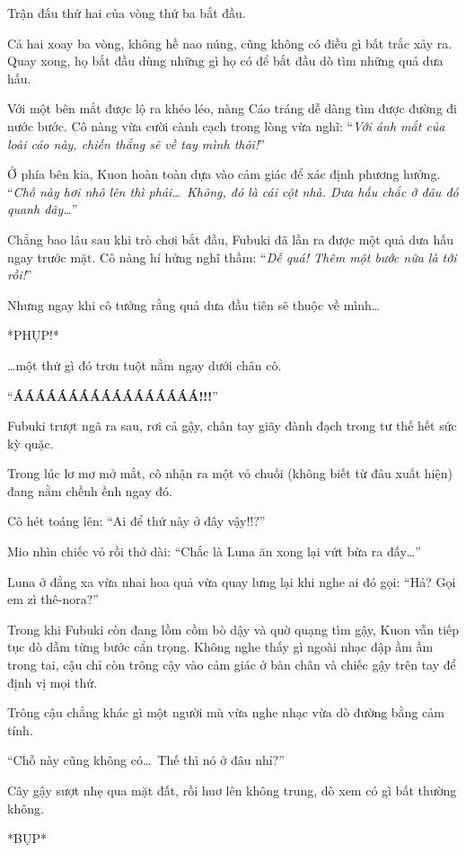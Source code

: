 \documentclass[../main.tex]{subfiles}
\begin{document}
Trận đấu thứ hai của vòng thứ ba bắt đầu.

Cả hai xoay ba vòng, không hề nao núng, cũng không có điều gì bất trắc xảy ra. Quay xong, họ bắt đầu dùng những gì họ có để bắt đầu dò tìm những quả dưa hấu.

Với một bên mắt được lộ ra khéo léo, nàng Cáo tráng dễ dàng tìm được đường đi nước bước. Cô nàng vừa cười cành cạch trong lòng vừa nghĩ: ``\textit{Với ánh mắt của loài cáo này, chiến thắng sẽ về tay mình thôi!}''

Ở phía bên kia, Kuon hoàn toàn dựa vào cảm giác để xác định phương hướng. ``\textit{Chỗ này hơi nhô lên thì phải\dots\ Không, đó là cái cột nhà. Dưa hấu chắc ở đâu đó quanh đây\dots}''

Chẳng bao lâu sau khi trò chơi bắt đầu, Fubuki đã lần ra được một quả dưa hấu ngay trước mặt. Cô nàng hí hửng nghĩ thầm:
``\textit{Dễ quá! Thêm một bước nữa là tới rồi!}''

Nhưng ngay khi cô tưởng rằng quả dưa đầu tiên sẽ thuộc về mình\dots

*PHỤP!*

\dots một thứ gì đó trơn tuột nằm ngay dưới chân cô.

``\textbf{ÁÁÁÁÁÁÁÁÁÁÁÁÁÁÁÁÁ!!!}''

Fubuki trượt ngã ra sau, rơi cả gậy, chân tay giãy đành đạch trong tư thế hết sức kỳ quặc.

Trong lúc lơ mơ mở mắt, cô nhận ra một vỏ chuối (không biết từ đâu xuất hiện) đang nằm chềnh ềnh ngay đó.

Cô hét toáng lên: ``Ai để thứ này ở đây vậy!!?''

Mio nhìn chiếc vỏ rồi thở dài: ``Chắc là Luna ăn xong lại vứt bừa ra đấy\dots''

Luna ở đằng xa vừa nhai hoa quả vừa quay lưng lại khi nghe ai đó gọi: ``Hả? Gọi em zì thê-nora?''

Trong khi Fubuki còn đang lồm cồm bò dậy và quờ quạng tìm gậy, Kuon vẫn tiếp tục dò dẫm từng bước cẩn trọng. Không nghe thấy gì ngoài nhạc đập ầm ầm trong tai, cậu chỉ còn trông cậy vào cảm giác ở bàn chân và chiếc gậy trên tay để định vị mọi thứ.

Trông cậu chẳng khác gì một người mù vừa nghe nhạc vừa dò đường bằng cảm tính.

``Chỗ này cũng không có\dots\ Thế thì nó ở đâu nhỉ?''

Cây gậy sượt nhẹ qua mặt đất, rồi huơ lên không trung, dò xem có gì bất thường không.

*BỤP*
\end{document}

